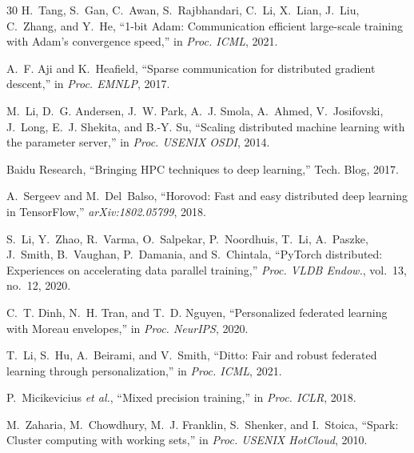 \documentclass[journal,twoside]{IEEEtran}
\begin{document}
\begin{thebibliography}{30}
H.~Tang, S.~Gan, C.~Awan, S.~Rajbhandari, C.~Li, X.~Lian, J.~Liu,
C.~Zhang, and Y.~He,
``1-bit {Adam}: Communication efficient large-scale training with
{Adam}'s convergence speed,''
in \emph{Proc. ICML}, 2021.

A.~F. Aji and K.~Heafield,
``Sparse communication for distributed gradient descent,''
in \emph{Proc. EMNLP}, 2017.

M.~Li, D.~G. Andersen, J.~W. Park, A.~J. Smola, A.~Ahmed,
V.~Josifovski, J.~Long, E.~J. Shekita, and B.-Y. Su,
``Scaling distributed machine learning with the parameter server,''
in \emph{Proc. USENIX OSDI}, 2014.

Baidu Research,
``Bringing {HPC} techniques to deep learning,''
Tech. Blog, 2017.

A.~Sergeev and M.~Del~Balso,
``{Horovod}: Fast and easy distributed deep learning in {TensorFlow},''
\emph{arXiv:1802.05799}, 2018.

S.~Li, Y.~Zhao, R.~Varma, O.~Salpekar, P.~Noordhuis, T.~Li,
A.~Paszke, J.~Smith, B.~Vaughan, P.~Damania, and S.~Chintala,
``{PyTorch} distributed: Experiences on accelerating data parallel
training,''
\emph{Proc. VLDB Endow.}, vol.~13, no.~12, 2020.

C.~T. Dinh, N.~H. Tran, and T.~D. Nguyen,
``Personalized federated learning with {Moreau} envelopes,''
in \emph{Proc. NeurIPS}, 2020.

T.~Li, S.~Hu, A.~Beirami, and V.~Smith,
``Ditto: Fair and robust federated learning through personalization,''
in \emph{Proc. ICML}, 2021.

P.~Micikevicius \emph{et al.},
``Mixed precision training,''
in \emph{Proc. ICLR}, 2018.

M.~Zaharia, M.~Chowdhury, M.~J. Franklin, S.~Shenker, and I.~Stoica,
``Spark: Cluster computing with working sets,''
in \emph{Proc. USENIX HotCloud}, 2010.

\end{thebibliography}
\end{document}
